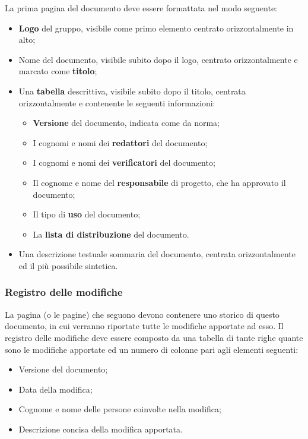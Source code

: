 	La prima pagina del documento deve essere formattata nel modo seguente:
	
	\begin{itemize}
	
		\item \textbf{Logo} del gruppo, visibile come primo elemento centrato orizzontalmente in alto;
		\item Nome del documento, visibile subito dopo il logo, centrato orizzontalmente e marcato come \textbf{titolo};
		\item Una \textbf{tabella} descrittiva, visibile subito dopo il titolo, centrata orizzontalmente e contenente le seguenti informazioni:
			\begin{itemize}
			
				\item \textbf{Versione} del documento, indicata come da norma;
				\item I cognomi e nomi dei \textbf{redattori} del documento;
				\item I cognomi e nomi dei \textbf{verificatori} del documento;
				\item Il cognome e nome del \textbf{responsabile} di progetto, che ha approvato il documento;
				\item Il tipo di \textbf{uso} del documento;
				\item La \textbf{lista di distribuzione} del documento.
			
			\end{itemize}
		\item Una descrizione testuale sommaria del documento, centrata orizzontalmente ed il più possibile sintetica.
	
	\end{itemize}
	
	\subsubsection{Registro delle modifiche}
	
	La pagina (o le pagine) che seguono devono contenere uno storico di questo documento, in cui verranno riportate tutte le modifiche apportate ad esso. Il registro delle modifiche deve essere composto da una tabella di tante righe quante sono le modifiche apportate ed un numero di colonne pari agli elementi seguenti:
	
	\begin{itemize}
	
		\item Versione del documento;
		\item Data della modifica;
		\item Cognome e nome delle persone coinvolte nella modifica;
		\item Descrizione concisa della modifica apportata.
	
	\end{itemize}
	
